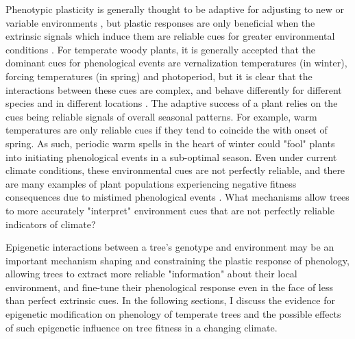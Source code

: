 \documentclass{article}\usepackage[]{graphicx}\usepackage[]{color}
\begin{document}
\par  Phenotypic plasticity is generally thought to be adaptive for adjusting to new or variable environments \citep{Crispo2007}, but plastic responses are only beneficial when the extrinsic signals which induce them are reliable cues for greater environmental conditions \citep{Hendry2015}. For temperate woody plants, it is generally accepted that the dominant cues for phenological events are vernalization temperatures (in winter), forcing temperatures (in spring) and photoperiod, but it is clear that the interactions between these cues are complex, and behave differently for different species and in different locations \citep{Forrest2010}. The adaptive success of a plant relies on the cues being reliable signals of overall seasonal patterns. For example, warm temperatures are only reliable cues if they tend to coincide the with onset of spring. As such, periodic warm spells in the heart of winter could "fool" plants into initiating phenological events in a sub-optimal season. Even under current climate conditions, these environmental cues are not perfectly reliable, and there are many examples of plant populations experiencing negative fitness consequences due to mistimed phenological events \citep{Inouye2008}. What mechanisms allow trees to more accurately "interpret" environment cues that are not perfectly reliable indicators of climate?
\par Epigenetic interactions between a tree's genotype and environment may be an important mechanism shaping and constraining the plastic response of phenology, allowing trees to extract more reliable "information" about their local environment, and fine-tune their phenological response even in the face of less than perfect extrinsic cues. In the following sections, I discuss the evidence for epigenetic modification on phenology of temperate trees and the possible effects of such epigenetic influence on tree fitness in a changing climate.
\end{document}
